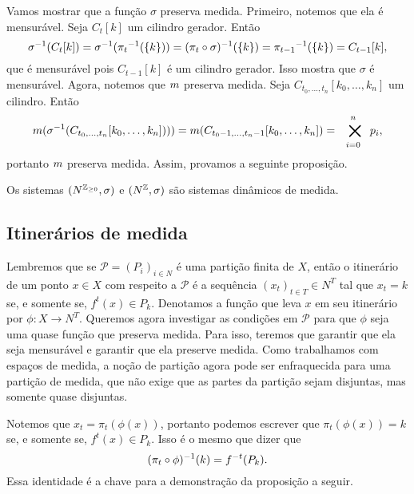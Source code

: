 Vamos mostrar que a função $\sigma$ preserva medida. Primeiro, notemos que ela é mensurável. Seja $C_t[k]$ um cilindro gerador. Então
	\begin{equation*}
	\sigma^{-1}(C_t[k]) = \sigma^{-1}({\pi_t}^{-1}(\{k\})) = (\pi_t \circ \sigma)^{-1}(\{k\}) = {\pi_{t-1}}^{-1}(\{k\}) = C_{t-1}[k],
	\end{equation*}
que é mensurável pois $C_{t-1}[k]$ é um cilindro gerador. Isso mostra que $\sigma$ é mensurável. Agora, notemos que $m$ preserva medida. Seja $C_{t_0,\ldots,t_n}[k_0,\ldots,k_n]$ um cilindro. Então
	\begin{equation*}
	\med(\sigma\inv(C_{t_0,\ldots,t_n}[k_0,\ldots,k_n]))) = \med(C_{t_0-1,\ldots,t_n-1}[k_0,\ldots,k_n]) = \bigtimes_{i=0}^n p_i,
	\end{equation*}
portanto $m$ preserva medida. Assim, provamos a seguinte proposição.

\begin{proposition}
Os sistemas $(N^{\mathbb{Z}_{\geq 0}},\sigma)$ e $(N^{\mathbb{Z}},\sigma)$ são sistemas dinâmicos de medida.
\end{proposition}

\subsection{Itinerários de medida}

Lembremos que se $\mathcal{P}=(P_i)_{i \in N}$ é uma partição finita de $X$, então o itinerário de um ponto $x \in X$ com respeito a $\mathcal{P}$ é a sequência $(x_t)_{t \in T} \in N^T$ tal que $x_t=k$ se, e somente se, $f^t(x) \in P_k$. Denotamos a função que leva $x$ em seu itinerário por $\phi: X \to N^T$. Queremos agora investigar as condições em $\mathcal{P}$ para que $\phi$ seja uma quase função que preserva medida. Para isso, teremos que garantir que ela seja mensurável e garantir que ela preserve medida. Como trabalhamos com espaços de medida, a noção de partição agora pode ser enfraquecida para uma partição de medida, que não exige que as partes da partição sejam disjuntas, mas somente quase disjuntas.

Notemos que $x_t = \pi_t(\phi(x))$, portanto podemos escrever que $\pi_t(\phi(x)) = k$ se, e somente se, $f^t(x) \in P_k$. Isso é o mesmo que dizer que
	\begin{equation*}
	(\pi_t \circ \phi)^{-1}(k) = f^{-t}(P_k).
	\end{equation*}
Essa identidade é a chave para a demonstração da proposição a seguir.

